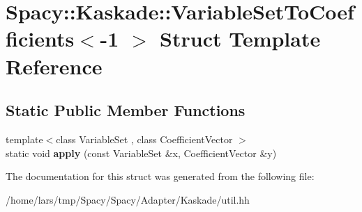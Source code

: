 \hypertarget{structSpacy_1_1Kaskade_1_1VariableSetToCoefficients_3-1_01_4}{}\section{Spacy\+:\+:Kaskade\+:\+:Variable\+Set\+To\+Coefficients$<$-\/1 $>$ Struct Template Reference}
\label{structSpacy_1_1Kaskade_1_1VariableSetToCoefficients_3-1_01_4}
\subsection*{Static Public Member Functions}
\begin{DoxyCompactItemize}
\item 
{\footnotesize template$<$class Variable\+Set , class Coefficient\+Vector $>$ }\\static void {\bfseries apply} (const Variable\+Set \&x, Coefficient\+Vector \&y)\hypertarget{structSpacy_1_1Kaskade_1_1VariableSetToCoefficients_3-1_01_4_a8691dbba4c04d6de55d1192ca85ad808}{}\label{structSpacy_1_1Kaskade_1_1VariableSetToCoefficients_3-1_01_4_a8691dbba4c04d6de55d1192ca85ad808}

\end{DoxyCompactItemize}


The documentation for this struct was generated from the following file\+:\begin{DoxyCompactItemize}
\item 
/home/lars/tmp/\+Spacy/\+Spacy/\+Adapter/\+Kaskade/util.\+hh\end{DoxyCompactItemize}

